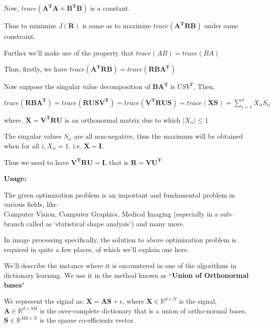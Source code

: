 \documentclass[fleqn, 11pt]{article}
\newcommand{\bs}[1]{\boldsymbol{#1}}
\newcommand{\R}[0]{\mathbb{R}}
\begin{document}
Now, $trace(\bs{A^TA + B^TB})$ is a constant.

Thus to  minimize $J(\boldsymbol{R})$ is same as to maximize $trace(\bs{A^TRB})$ under same constraint. 

\medskip 

Further we'll make use of the property that $ trace(AB) = trace(BA) $ 

\smallskip

Thus, firstly, we have $trace(\bs{A^TRB}) = trace(\bs{RBA^T})$

\medskip 

Now suppose the singular value decomposition of $\bs{BA^T}$ is $USV^T$. Then, 
\begin{center}
    $trace(\bs{RBA^T})  =  trace(\bs{RUSV^T}) =  trace(\bs{V^TRUS}) =  trace(\bs{XS}) 
    = \displaystyle \sum_{i=1}^n X_{ii} S_{ii}   $
\end{center}
where, $\bs{X=V^TRU}$ is an orthonormal matrix due to which $|X_{ii}| \leq 1$ 

The singular values $S_{ii}$ are all non-negative, thus the maximum will be obtained when 
for all $i, X_{ii}=1$, i.e. $\bs{X=I}$. 

Thus we need to have $\bs{V^TRU=I}$, that is $\bs{R=VU^T}$


\hrulefill


\newpage 

\textbf{Usage: }

\medskip

The given optimization problem is an important and fundamental problem in various fields, like   \\ 
Computer Vision, Computer Graphics, Medical Imaging (especially in a sub-branch called as `statistical shape analysis') and many more.

\medskip

In image processing specifically, the solution to above optimization problem is required in quite a few places, of which we'll explain one here. 

\medskip 

We'll describe the instance where it is encountered in one of the algorithms in dictionary learning. We use it in the method known as ``\textbf{Union of Orthonormal bases}"

\smallskip

We represent the signal as: $\bs{X}=\bs{AS}+\epsilon$, where $\bs{X} \in \R^{d \times N}$ is the signal, 
$\bs{A} \in \R^{d \times Md} $ is the over-complete dictionary that is a union of ortho-normal
bases,  $\bs{S} \in \R^{Md \times N} $ is 
the sparse co-efficients vector. 
\end{document}

